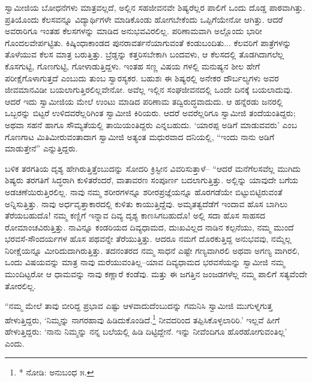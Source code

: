 ಸ್ವಾಮೀಜಿಯ ಬೋಧನೆಗಳು ಮಾತ್ರವಲ್ಲದೆ, ಅಲ್ಲಿನ ಸಹಜೀವನವೇ ಶಿಷ್ಯರೆಲ್ಲರ ಪಾಲಿಗೆ ಒಂದು ದೊಡ್ಡ ಪಾಠವಾಗಿತ್ತು. ಪ್ರತಿಯೊಂದು ಕೆಲಸವನ್ನೂ ವಿದ್ಯಾರ್ಥಿಗಳೇ ಮಾಡಿಕೊಂಡು ಹೋಗಬೇಕೆಂದು ಒಪ್ಪಿಗೆಯೇನೋ ಆಗಿತ್ತು. ಆದರೆ ಅವರಾರಿಗೂ ಇಂತಹ ಕೆಲಸಗಳನ್ನು ಮಾಡಿದ ಅನುಭವವಿರಲಿಲ್ಲ. ಪರಿಣಾಮವಾಗಿ ಅಲ್ಲೊಂದು ಭಾರೀ ಗೊಂದಲವೇರ್ಪಟ್ಟಿತು. ಕಿಷ್ಕಿಂಧಾಕಾಂಡದ ಪುನರಾವರ್ತನೆಯಾಗುವಂತೆ ಕಂಡುಬಂದಿತು... ಕೆಲವರಿಗೆ ಪಾತ್ರೆಗಳನ್ನು ತೊಳೆಯುವ ಕೆಲಸ ಮಾತ್ರ ಬರುತ್ತಿತ್ತು. ಬ್ರೆಡ್ಡನ್ನು ಕತ್ತರಿಸಬೇಕಾಗಿ ಬಂದವಳು, ಆ ಕೆಲಸದಲ್ಲಿ ತೊಡಗಿದಾಗಲೆಲ್ಲ ಕೊಸಗುಟ್ಟಿ, ಗೊಣಗುಟ್ಟಿ, ಗೋಳಾಡುತ್ತಿದ್ದಳು. ಇಂತಹ ಸಣ್ಣ ವಿಷಯ ಗಳಲ್ಲಿ ಮನುಷ್ಯನ ಶೀಲ ಹೇಗೆ ಪರೀಕ್ಷೆಗೊಳಾಗುತ್ತದೆ ಎಂಬುದು ತುಂಬ ಸ್ವಾರಸ್ಯಕರ. ಬಹುಶಃ ಈ ಶಿಷ್ಯರಲ್ಲಿ ಅನೇಕರ ದೌರ್ಬಲ್ಯಗಳು ಅವರ ಜೀವಮಾನವಿಡೀ ಬಯಲಾಗುತ್ತಿರಲಿಲ್ಲವೇನೋ. ಅವೆಲ್ಲ ಇಲ್ಲಿನ ಸಂಘಜೀವನದಲ್ಲಿ ಒಂದೇ ದಿನಕ್ಕೆ ಬಯಲಾದುವು. ಆದರೆ ಇದು ಸ್ವಾಮೀಜಿಯ ಮೇಲೆ ಉಂಟು ಮಾಡಿದ ಪರಿಣಾಮ ತದ್ವಿರುದ್ಧವಾದುದು. ಆ ಹನ್ನೆರಡು ಜನರಲ್ಲಿ ಒಬ್ಬರನ್ನು ಬಿಟ್ಟರೆ ಉಳಿದವರೆಲ್ಲರಿಗಿಂತ ಸ್ವಾಮೀಜಿ ಕಿರಿಯರು. ಆದರೆ ಅವರೆಲ್ಲರಿಗೂ ಸ್ವಾಮೀಜಿ ತಂದೆಯಂತಿದ್ದರು; ಅಥವಾ ಸಹನೆ ಹಾಗೂ ಸೌಮ್ಯತೆಯಲ್ಲಿ ತಾಯಿಯಂತಿದ್ದರು ಎನ್ನಬಹುದು. ‘ಯಾರಪ್ಪ ಅಡಿಗೆ ಮಾಡುವವರು’ ಎಂಬ ಗೊಣಗಾಟ ಮಿತಿಮೀರುವಂತಾದಾಗ ಸ್ವಾಮೀಜಿ ಅತ್ಯಂತ ಮಧುರವಾದ ದನಿಯಲ್ಲಿ, “ಇಂದು ನಾನು ಅಡಿಗೆ ಮಾಡುತ್ತೇನೆ” ಎನ್ನುತ್ತಿದ್ದರು.

ಬಳಿಕ ತರಗತಿಯ ದೃಶ್ಯ ಹೇಗಿರುತ್ತಿತ್ತೆಂಬುದನ್ನು ಸೋದರಿ ಕ್ರಿಸ್ಟೀನ ವಿವರಿಸುತ್ತಾಳೆ– “ಆದರೆ ಮನೆಗೆಲಸವೆಲ್ಲ ಮುಗಿದು ಶಿಷ್ಯರು ತರಗತಿಗೆ ಸಿದ್ಧರಾಗಿ ಕುಳಿತರೆಂದರೆ, ವಾತಾವರಣ ಸಂಪೂರ್ಣ ಬದಲಾಗುತ್ತಿತ್ತು. ಅಲ್ಲಿನ್ನು ಯಾವುದೇ ಬಗೆಯ ಅಡಚಣೆಯಿರುತ್ತಿರಲಿಲ್ಲ. ನಾವು ನಮ್ಮ ಶರೀರಗಳನ್ನೂ ಶರೀರಪ್ರಜ್ಞೆಯನ್ನೂ ಹೊರಗಡೆಯೇ ಬಿಟ್ಟುಬಿಟ್ಟಿರುವಂತೆ ಅನ್ನಿಸುತ್ತಿತ್ತು. ನಾವು ಅರ್ಧವೃತ್ತಾಕಾರದಲ್ಲಿ ಕುಳಿತು ಕಾಯುತ್ತಿದ್ದೆವು. ಅಮೃತತ್ವದೆಡೆಗೆ ಇಂದಾವ ಹೊಸ ಬಾಗಿಲು ತೆರೆಯಬಹುದೊ! ನಮ್ಮ ಕಣ್ಣಿಗೆ ಇನ್ನಾವ ದಿವ್ಯ ದೃಶ್ಯ ಕಾಣಸಿಗಬಹುದೊ! ಅಲ್ಲಿ ಸದಾ ಹೊಸ ಸಾಹಸದ ರೋಮಾಂಚವಿರುತ್ತಿತ್ತು. ನಾವಿನ್ನೂ ಕಂಡರಿಯದ ದಿವ್ಯಧಾಮದ, ದುಃಖವಿಲ್ಲದ ನಾಡಿನ ಕಲ್ಪನೆಯು, ನಮ್ಮ ಮುಂದೆ ಭರವಸೆ-ಸೌಂದರ್ಯಗಳ ಹೊಸ ಪಥವನ್ನೇ ತೆರೆಯುತ್ತಿತ್ತು. ಆದರೂ ನಮಗೆ ದೊರಕುತ್ತಿದ್ದ ಅನುಭವವು, ನಮ್ಮೆಲ್ಲ ನಿರೀಕ್ಷೆಯನ್ನೂ ಮೀರಿದುದಾಗಿರುತ್ತಿತ್ತು. ತದನಂತರದ ನಮ್ಮ ಸಾಧನೆ ಎಷ್ಟೇ ಗಣ್ಯವಾಗಿರಲಿ ಅಥವಾ ಅಗಣ್ಯ ವಾಗಿರಲಿ, ಒಂದು ವಿಷಯವನ್ನು ಮಾತ್ರ ನಾವು ಮರೆಯುವಂತಿಲ್ಲ–ಯಾವ ದಿವ್ಯಧಾಮದ ಭರವಸೆಯನ್ನು ಸ್ವಾಮೀಜಿ ನಮ್ಮ ಮುಂದಿಟ್ಟರೋ ಆ ಧಾಮವನ್ನು ನಾವು ಕಣ್ಣಾರೆ ಕಂಡೆವು. ಮತ್ತು ಈ ಜಗತ್ತಿನ ಜಂಜಡಗಳೆಲ್ಲ ನಮ್ಮ ಪಾಲಿಗೆ ಸತ್ಯವೆಂದೇ ತೋರಲಿಲ್ಲ.

“ನಮ್ಮ ಮೇಲೆ ತಾವು ಬೀರಿದ್ದ ಪ್ರಭಾವ ಎಷ್ಟು ಆಳವಾದುದೆಂಬುದನ್ನು ಗಮನಿಸಿ ಸ್ವಾಮೀಜಿ ಮುಗುಳ್ನಗುತ್ತ ಹೇಳುತ್ತಿದ್ದರು, ‘ನಿಮ್ಮನ್ನು ನಾಗರಹಾವು ಹಿಡಿದುಕೊಂಡಿದೆ.\footnote{* ನೋಡಿ: ಅನುಬಂಧ ೫.} ನೀವದರಿಂದ ತಪ್ಪಿಸಿಕೊಳ್ಳಲಾರಿರಿ.’ ಇಲ್ಲವೆ ಹೀಗೆ ಹೇಳುತ್ತಿದ್ದರು: ‘ನಾನು ನಿಮ್ಮನ್ನು ನನ್ನ ಬಲೆಯಲ್ಲಿ ಹಿಡಿ ದಿಟ್ಟಿದ್ದೇನೆ. ಇನ್ನು ನೀವೆಂದಿಗೂ ಹೊರಹೋಗುವಂತಿಲ್ಲ’ ಎಂದು.

